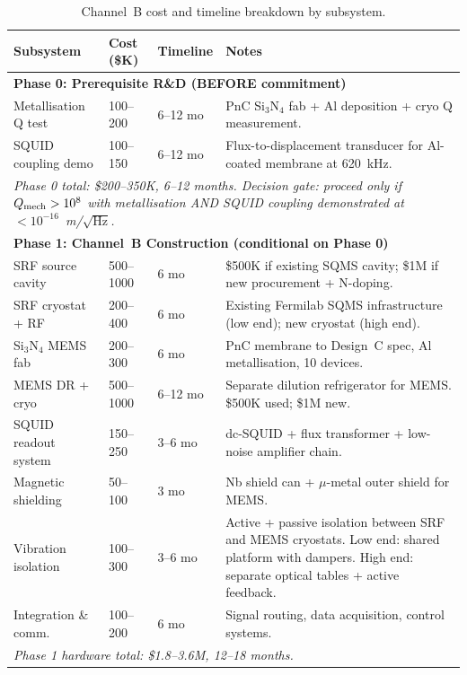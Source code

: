 \documentclass[11pt]{article}
\newcommand{\Qmech}{Q_{\rm mech}}
\theoremstyle{definition}
\theoremstyle{remark}
\begin{document}
\begin{table}[H]
\centering
\caption{Channel~B cost and timeline breakdown by subsystem.}
\label{tab:cost_breakdown}
\renewcommand{\arraystretch}{1.3}
\begin{tabular}{@{}p{4cm}p{2cm}p{2cm}p{4cm}@{}}
\toprule
\textbf{Subsystem} & \textbf{Cost (\$K)} & \textbf{Timeline} &
  \textbf{Notes} \\
\midrule
\multicolumn{4}{l}{\textbf{Phase 0: Prerequisite R\&D (BEFORE commitment)}} \\
\midrule
Metallisation Q test &
  100--200 & 6--12 mo &
  PnC Si$_3$N$_4$ fab + Al deposition + cryo Q measurement. \\
SQUID coupling demo &
  100--150 & 6--12 mo &
  Flux-to-displacement transducer for Al-coated membrane at 620~kHz. \\
\midrule
\multicolumn{4}{l}{\textit{Phase 0 total: \$200--350K, 6--12 months.
Decision gate: proceed only if $\Qmech > 10^8$ with metallisation
AND SQUID coupling demonstrated at $< 10^{-16}$~m/$\sqrt{\text{Hz}}$.}} \\
\midrule
\multicolumn{4}{l}{\textbf{Phase 1: Channel~B Construction (conditional on Phase 0)}} \\
\midrule
SRF source cavity &
  500--1000 & 6 mo &
  \$500K if existing SQMS cavity; \$1M if new procurement + N-doping. \\
SRF cryostat + RF &
  200--400 & 6 mo &
  Existing Fermilab SQMS infrastructure (low end); new cryostat (high end). \\
Si$_3$N$_4$ MEMS fab &
  200--300 & 6 mo &
  PnC membrane to Design~C spec, Al metallisation, 10 devices. \\
MEMS DR + cryo &
  500--1000 & 6--12 mo &
  Separate dilution refrigerator for MEMS. \$500K used; \$1M new. \\
SQUID readout system &
  150--250 & 3--6 mo &
  dc-SQUID + flux transformer + low-noise amplifier chain. \\
Magnetic shielding &
  50--100 & 3 mo &
  Nb shield can + $\mu$-metal outer shield for MEMS. \\
Vibration isolation &
  100--300 & 3--6 mo &
  Active + passive isolation between SRF and MEMS cryostats.
  Low end: shared platform with dampers.
  High end: separate optical tables + active feedback. \\
Integration \& comm. &
  100--200 & 6 mo &
  Signal routing, data acquisition, control systems. \\
\midrule
\multicolumn{4}{l}{\textit{Phase 1 hardware total: \$1.8--3.6M, 12--18 months.}} \\

\end{tabular}
\end{table}
\end{document}
